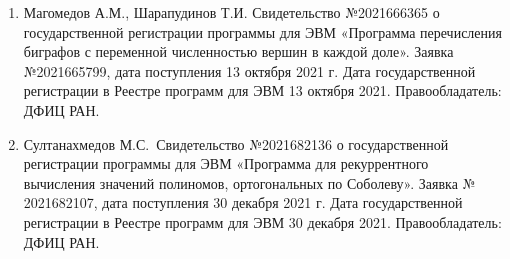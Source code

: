 \begin{enumerate}[1]
    \item
    Магомедов А.М., Шарапудинов Т.И. Свидетельство №2021666365 о государственной регистрации программы для ЭВМ «Программа перечисления биграфов с переменной численностью вершин в каждой доле». Заявка №2021665799, дата поступления 13 октября 2021 г. Дата государственной регистрации в Реестре программ для ЭВМ 13 октября 2021. Правообладатель: ДФИЦ РАН.
    
    \item
    Султанахмедов М.С.~Свидетельство №2021682136 о государственной регистрации программы для ЭВМ «Программа для рекуррентного вычисления значений полиномов, ортогональных по Соболеву». Заявка № 2021682107, дата поступления 30 декабря 2021 г. Дата государственной регистрации в Реестре программ для ЭВМ 30 декабря 2021. Правообладатель: ДФИЦ РАН.
\end{enumerate}
